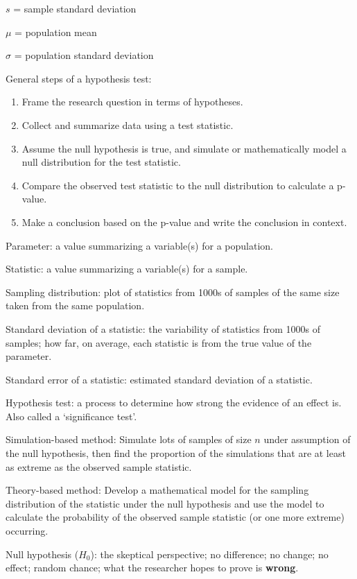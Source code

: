 \documentclass[
]{report}
\begin{document}
\(s\) = sample standard deviation

\(\mu\) = population mean

\(\sigma\) = population standard deviation

General steps of a hypothesis test:

\begin{enumerate}
\def\labelenumi{\arabic{enumi}.}
\item
  Frame the research question in terms of hypotheses.
\item
  Collect and summarize data using a test statistic.
\item
  Assume the null hypothesis is true, and simulate or mathematically model a null distribution for the test statistic.
\item
  Compare the observed test statistic to the null distribution to calculate a p-value.
\item
  Make a conclusion based on the p-value and write the conclusion in context.
\end{enumerate}

Parameter: a value summarizing a variable(s) for a population.

Statistic: a value summarizing a variable(s) for a sample.

Sampling distribution: plot of statistics from 1000s of samples of the same size taken from the same population.

Standard deviation of a statistic: the variability of statistics from 1000s of samples; how far, on average, each statistic is from the true value of the parameter.

Standard error of a statistic: estimated standard deviation of a statistic.

Hypothesis test: a process to determine how strong the evidence of an effect is. Also called a `significance test'.

Simulation-based method: Simulate lots of samples of size \(n\) under assumption of the null hypothesis, then find the proportion of the simulations that are at least as extreme as the observed sample statistic.

Theory-based method: Develop a mathematical model for the sampling distribution of the statistic under the null hypothesis and use the model to calculate the probability of the observed sample statistic (or one more extreme) occurring.

Null hypothesis (\(H_0\)): the skeptical perspective; no difference; no change; no effect; random chance; what the researcher hopes to prove is \textbf{wrong}.
\end{document}
